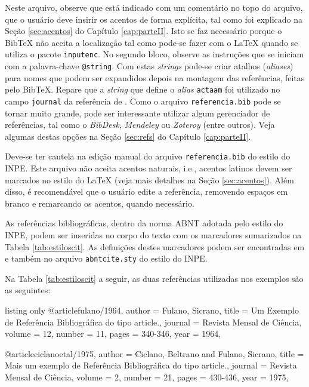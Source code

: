 Neste arquivo, observe que está indicado com um comentário no topo do arquivo, que o usuário deve insirir os acentos de forma explícita, tal como foi explicado na Seção \ref{sec:acentos} do Capítulo \ref{cap:parteII}. Isto se faz necessário porque o Bib\TeX{} não aceita a localização tal como pode-se fazer com o \LaTeX{} quando se utiliza o pacote {\tt inputenc}. No segundo bloco, observe as instruções que se iniciam com a palavra-chave {\tt @string}. Com estas \textit{strings} pode-se criar atalhos (\textit{aliases}) para nomes que podem ser expandidos depois na montagem das referências, feitas pelo Bib\TeX{}. Repare que a \textit{string} que define o \textit{alias} {\tt actaam} foi utilizado no campo {\tt journal} da referência de . Como o arquivo {\tt referencia.bib} pode se tornar muito grande, pode ser interessante utilizar algum gerenciador de referências, tal como o \textit{BibDesk}, \textit{Mendeley} ou \textit{Zoteroy} (entre outros). Veja algumas destas opções na Seção \ref{sec:refs} do Capítulo \ref{cap:parteII}. 

\begin{marker}
Deve-se ter cautela na edição manual do arquivo {\tt referencia.bib} do estilo do INPE. Este arquivo não aceita acentos naturais, i.e., acentos latinos devem ser marcados no estilo do \LaTeX{} (veja mais detalhes na Seção \ref{sec:acentos}). Além disso, é recomendável que o usuário edite a referência, removendo espaços em branco e remarcando os acentos, quando necessário.
\end{marker}

As referências bibliográficas, dentro da norma ABNT adotada pelo estilo do INPE, podem ser inseridas no corpo do texto com os marcadores sumarizados na Tabela \ref{tab:estiloscit}. As definições destes marcadores podem ser encontradas em  e também no arquivo {\tt abntcite.sty} do estilo do INPE.

Na Tabela \ref{tab:estiloscit} a seguir, as duas referências utilizadas nos exemplos são as seguintes:

\begin{texexp}{listing only}
@article{fulano/1964,
  author = {Fulano, Sicrano},
  title = {Um Exemplo de Refer{\^e}ncia Bibliogr{\'a}fica do tipo article.},
  journal = {Revista Mensal de Ci{\^e}ncia},
  volume = {12},
  number = {11},
  pages = {340-346},
  year = {1964},
}

@article{ciclanoetal/1975,
  author = {Ciclano, Beltrano and Fulano, Sicrano},
  title = {Mais um exemplo de Refer{\^e}ncia Bibliogr{\'a}fica do tipo article.},
  journal = {Revista Mensal de Ci{\^e}ncia},
  volume = {2},
  number = {21},
  pages = {430-436},
  year = {1975},
}
\end{texexp}

